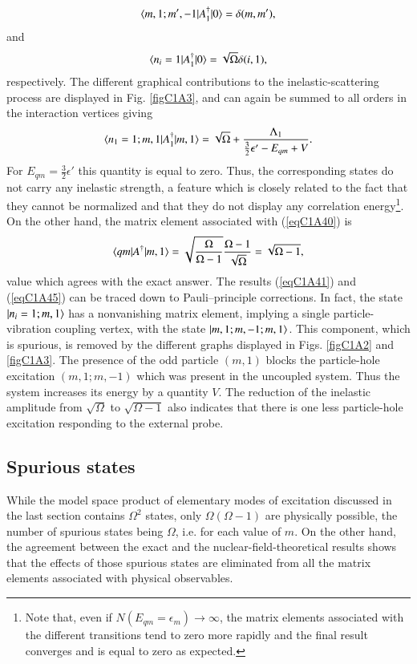  \begin{align}\label{eqC1A42} 
\langle {m,1;m',-1|A_1^\dagger|0} \rangle=\delta(m,m'),
 \end{align}
and
 \begin{align}\label{eqC1A43} 
\langle {n_i=1|A_1^\dagger|0} \rangle=\sqrt{\Omega}\delta(i,1),
 \end{align}
respectively. The different graphical contributions to the inelastic-scattering
process are displayed in Fig. \ref{figC1A3}, and can again be summed to all orders in the
interaction vertices giving
 \begin{align}\label{eqC1A44} 
\langle {n_1=1;m,1|A_1^\dagger|m,1} \rangle=\sqrt{\Omega}+\frac{\Lambda_1}{\frac{3}{2}\epsilon'-E_{qm}+V}.
 \end{align}
For $E_{qm}=\frac{3}{2}\epsilon'$ this quantity is equal to zero. Thus, the corresponding states
do not carry any inelastic strength, a feature which is closely related to the
fact that they cannot be normalized and that they do not display any correlation energy\footnote{Note that, even if $N(E_{qm}=\epsilon_m)\rightarrow\infty$, the matrix elements associated with the different transitions tend to zero more rapidly and the final result converges and is equal
to zero as expected.}.
On the other hand, the matrix element associated with (\ref{eqC1A40}) is
 \begin{align}\label{eqC1A45} 
\langle {qm|A^\dagger|m,1} \rangle=\sqrt{\frac{\Omega}{\Omega-1}}\frac{\Omega-1}{\sqrt{\Omega}}=\sqrt{\Omega-1},
 \end{align}
value which agrees with the exact answer.
The results (\ref{eqC1A41}) and (\ref{eqC1A45}) can be traced down to Pauli--principle corrections. In fact, the state $|{n_i=1;m,1} \rangle$ has a nonvanishing matrix element,
implying a single particle-vibration coupling vertex, with the state $|{m,1;m,-1;m,1} \rangle$. This component, which is spurious, is removed by the different graphs displayed in Figs. \ref{figC1A2} and \ref{figC1A3}. The presence of the odd particle
$(m, 1)$ blocks the particle-hole excitation $(m,1; m,- 1)$ which was present in
the uncoupled system. Thus the system increases its energy by a quantity $V$.
The reduction of the inelastic amplitude from $\sqrt{\Omega}$ to $\sqrt{\Omega-1}$  also indicates
that there is one less particle-hole excitation responding to the external probe.
\subsection{Spurious states}\label{C1S7sS3}
While the model space product of elementary modes of excitation discussed
in the last section contains $\Omega^2$ states, only $\Omega(\Omega-1)$ are physically possible,
the number of spurious states being $\Omega$, i.e. for each value of $m$. On the other hand, the agreement
between the exact and the nuclear-field-theoretical results shows that the effects of those spurious states are eliminated from all the matrix elements associated with physical observables.


